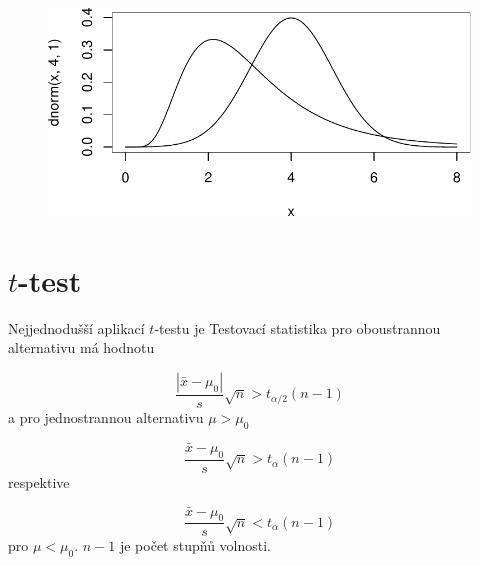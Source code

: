\documentclass[
  letterpaper,
  DIV=11,
  numbers=noendperiod]{scrreprt}
\begin{document}
\begin{figure}[H]

{\centering \includegraphics{06_odhad_files/figure-pdf/unnamed-chunk-6-2.pdf}

}

\end{figure}

\hypertarget{ttest}{%
\section{\texorpdfstring{\(t\)-test}{t-test}}\label{ttest}}

Nejjednodušší aplikací \(t\)-testu je Testovací statistika pro
oboustrannou alternativu má hodnotu

\[
\dfrac{|\bar{x} - \mu_0|}{s}\sqrt{n} > t_{\alpha/2}(n-1)
\] a pro jednostrannou alternativu \(\mu > \mu_0\)

\[
\dfrac{\bar{x} - \mu_0}{s}\sqrt{n} > t_{\alpha}(n-1)
\] respektive

\[
\dfrac{\bar{x} - \mu_0}{s}\sqrt{n} < t_{\alpha}(n-1)
\] pro \(\mu < \mu_0\). \(n-1\) je počet stupňů volnosti.
\end{document}
